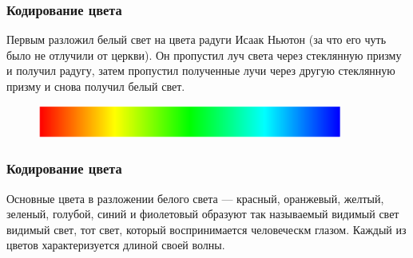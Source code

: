 \begin{frame}
\frametitle{Кодирование цвета}
Первым разложил белый свет на цвета радуги Исаак Ньютон (за что его чуть было не отлучили от церкви). Он пропустил луч света через стеклянную призму и получил радугу, затем пропустил полученные лучи через другую стеклянную призму и снова получил белый свет.

\begin{figure}[htbp] \begin{center}
\includegraphics[width=10cm]{images/part11}

\end{center} \end{figure}
\end{frame}

\begin{frame}
\frametitle{Кодирование цвета}

Основные цвета в разложении белого света --- красный, оранжевый, желтый, зеленый, голубой, синий и фиолетовый образуют так называемый видимый свет видимый свет, тот свет, который воспринимается человеческм глазом. Каждый из цветов характеризуется длиной своей волны.

\end{frame}


